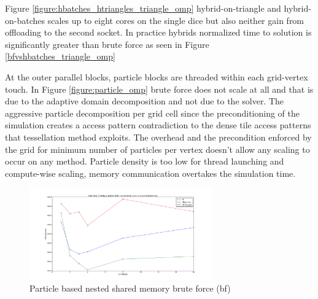 \documentclass[times,12pt]{article}
\begin{document}
Figure \ref{figure:hbatches_htriangles_triangle_omp} hybrid-on-triangle and hybrid-on-batches scales up to eight cores on the single dice but also neither gain from offloading to the second socket. In practice hybrids normalized time to solution is significantly greater than brute force as seen in Figure \ref{bfvshbatches_triangle_omp}



At the outer parallel blocks, particle blocks are threaded within each grid-vertex touch. In Figure \ref{figure:particle_omp} brute force does not scale at all and that is due to the adaptive domain decomposition and not due to the solver. The aggressive particle decomposition per grid cell since the preconditioning of the simulation creates a access pattern contradiction to the dense tile access patterns that tessellation method exploits. The overhead and the precondition enforced by the grid for minimum number of particles per vertex doesn't allow any scaling to occur on any method. Particle density is too low for thread launching and compute-wise scaling, memory communication overtakes the simulation time. 

\begin{figure}[htb]
  \begin{center}
    \includegraphics[width=0.7\textwidth]{experiments/random/omp/particle_triangle_based_x0.png}
  \end{center}
  \caption{Particle based nested shared memory brute force (bf)}
  \label{figure:particletriangle_omp}
\end{figure}


\end{document}
